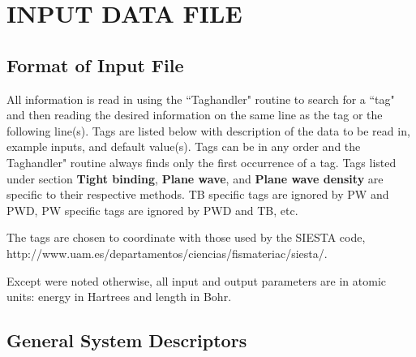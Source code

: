 \section{INPUT DATA FILE}


\subsection{Format of Input File}

All information is read in using the ``Taghandler" routine to
search for a ``tag" and then reading the desired information on the
same line as the tag or the following line(s).  Tags are listed
below with description of the data to be read in, example inputs,
and default value(s).  Tags can be in any order and the
Taghandler" routine always finds only the first occurrence of a
tag. Tags listed under section {\bf Tight binding}, {\bf Plane
wave}, and {\bf Plane wave density} are specific to their
respective methods. TB specific tags are ignored by PW and PWD, PW
specific tags are ignored by PWD and TB, etc.

The tags are chosen to coordinate with those used by the SIESTA
code,
http://www.uam.es/departamentos/ciencias/fismateriac/siesta/.

Except were noted otherwise, all input and output parameters are
in atomic units: energy in Hartrees and length in Bohr.


\subsection{General System Descriptors}

